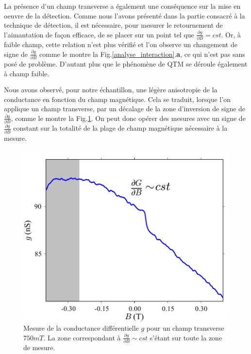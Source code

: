 La présence d'un champ transverse a également une conséquence sur la mise en oeuvre de la détection. Comme nous l'avons présenté dans la partie consacré à la technique de détection, il est nécessaire, pour mesurer le retournement de l'aimantation de façon efficace, de se placer sur un point tel que $\frac{\partial g}{\partial B} = cst$. Or, à faible champ, cette relation n'est plus vérifié et l'on observe un changement de signe de $\frac{\partial g}{\partial B}$  comme le montre la Fig.\ref{analyse_interaction}.\textbf{a}, ce qui n'est pas sans posé de problème. D'autant plus que le phénomène de QTM se déroule également à champ faible.

Nous avons observé, pour notre échantillon, une légère anisotropie de la conductance en fonction du champ magnétique. Cela se traduit, lorsque l'on applique un champ transverse, par un décalage de la zone d'inversion de signe de $\frac{\partial g}{\partial B}$, comme le montre la Fig.\ref{TransInfl}. On peut donc opérer des mesures avec un signe de  $\frac{\partial g}{\partial B}$ constant sur la totalité de la plage de champ magnétique nécessaire à la mesure.


\begin{figure}
\parbox{7cm}{
\includegraphics[scale=0.45]{Resultats/TransInfl/TransInfl.pdf} 
}
\parbox{6.5cm}{\caption{Mesure de la conductance différentielle $g$ pour un champ transverse $750mT$. La zone correspondant à $\frac{\partial g}{\partial B} \sim cst$ s'étant sur toute la zone de mesure.}
\label{TransInfl}
}
\end{figure}




